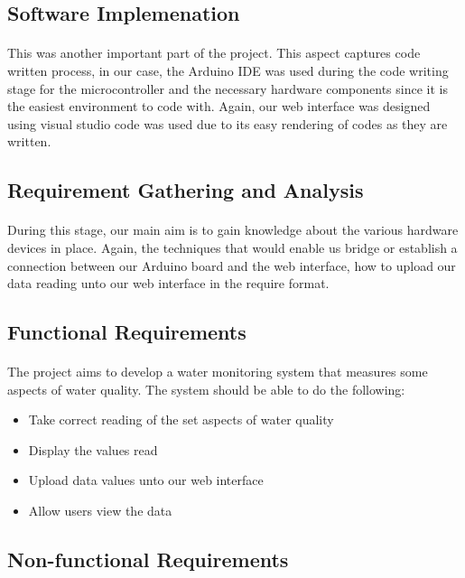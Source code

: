 \documentclass[12pt]{article}
\begin{document}
\subsection*{Software Implemenation}
\paragraph*{}
This was another important part of the project. This aspect captures code written process, in our case, the Arduino IDE was used during the code writing stage for the microcontroller and the necessary hardware components since it is the easiest environment to code with. Again, our web interface was designed using visual studio code was used due to its easy rendering of codes as they are written.  

\subsection*{Requirement Gathering and Analysis}
\paragraph*{}
During this stage, our main aim is to gain knowledge about the various hardware devices in place. Again, the techniques that would enable us bridge or establish a connection between our Arduino board and the web interface, how to upload our data reading unto our web interface in the require format.

\subsection*{Functional Requirements}
\paragraph*{}
The project aims to develop a water monitoring system that measures some aspects of water quality. The system should be able to do the following:
\begin{itemize}
\item   Take correct reading of the set aspects of water quality
\item	Display the values read
\item	Upload data values unto our web interface
\item	Allow users view the data
\end{itemize}

\subsection*{Non-functional Requirements}
\end{document}
